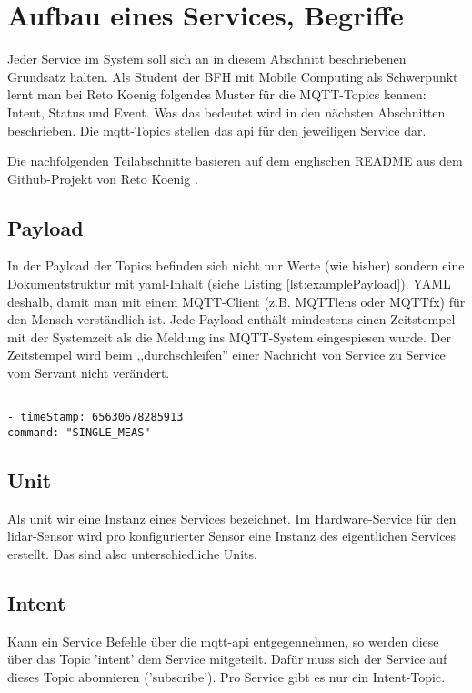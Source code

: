 \section{Aufbau eines Services, Begriffe}
\label{sec:isePattern}
Jeder Service im System soll sich an in diesem Abschnitt beschriebenen Grundsatz halten. Als Student der BFH mit Mobile Computing als Schwerpunkt lernt man bei Reto Koenig folgendes Muster für die MQTT-Topics kennen: Intent, Status und Event. Was das bedeutet wird in den nächsten Abschnitten beschrieben. Die \acrshort{mqtt}-Topics stellen das \acrshort{api} für den jeweiligen Service dar.

Die nachfolgenden Teilabschnitte basieren auf dem englischen README aus dem Github-Projekt von Reto Koenig \cite{ch.quantasy.mqtt.gateway}.
\subsection{Payload}
In der Payload der Topics befinden sich nicht nur Werte (wie bisher) sondern eine Dokumentstruktur mit \acrshort{yaml}-Inhalt (siehe Listing \ref{lst:examplePayload}). YAML deshalb, damit man mit einem MQTT-Client (z.B. MQTTlens\cite{mqtt-lens} oder MQTTfx\cite{mqttfx}) für den Mensch verständlich ist. Jede Payload enthält mindestens einen Zeitstempel mit der Systemzeit als die Meldung ins MQTT-System eingespiesen wurde. Der Zeitstempel wird beim ,,durchschleifen'' einer Nachricht von Service zu Service vom Servant nicht verändert. 

\begin{lstlisting}[caption={Beispiel einer MQTT-Payload}, label={lst:examplePayload}]
---
- timeStamp: 65630678285913
command: "SINGLE_MEAS"
\end{lstlisting}

\subsection{Unit}
Als \gls{unit} wir eine Instanz eines Services bezeichnet. Im Hardware-Service für den \acrshort{lidar}-Sensor wird pro konfigurierter Sensor eine Instanz des eigentlichen Services erstellt. Das sind also unterschiedliche Units.
\subsection{Intent}
Kann ein Service Befehle über die \acrshort{mqtt}-\acrshort{api} entgegennehmen, so werden diese über das Topic '\gls{intent}' dem Service mitgeteilt. Dafür muss sich der Service auf dieses Topic abonnieren ('subscribe'). Pro Service gibt es nur ein Intent-Topic.
